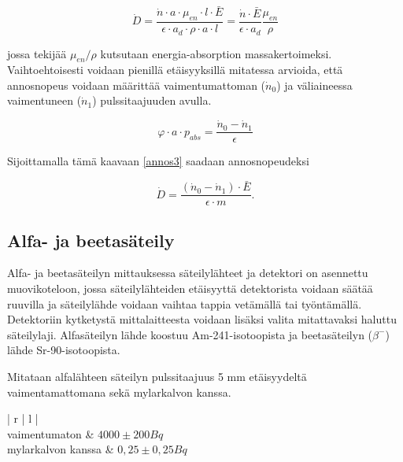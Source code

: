 \documentclass[a4paper,11pt]{article}
\begin{document}
\begin{equation}
  \dot{D} = \frac{\dot{n} \cdot a \cdot \mu_{en} \cdot l \cdot \bar{E}}{\epsilon \cdot a_d \cdot \rho \cdot a \cdot l} = \frac{\dot{n} \cdot \bar{E}}{\epsilon \cdot a_d} \frac{ \mu_{en}}{\rho}
\end{equation}

jossa tekijää $\mu_{en}/\rho$ kutsutaan energia-absorption massakertoimeksi. Vaihtoehtoisesti voidaan pienillä etäisyyksillä mitatessa arvioida, että annosnopeus voidaan määrittää vaimentumattoman ($\dot{n}_0$) ja väliaineessa vaimentuneen ($\dot{n}_1$) pulssitaajuuden avulla. 

\begin{equation}
  \varphi \cdot a \cdot p_{abs} = \frac{\dot{n}_0-\dot{n}_1}{\epsilon}
\end{equation}

Sijoittamalla tämä kaavaan \ref{annos3} saadaan annosnopeudeksi

\begin{equation}
  \dot{D} = \frac{(\dot{n}_0-\dot{n}_1) \cdot \bar{E}}{\epsilon \cdot m} .
\end{equation}

\subsection{Alfa- ja beetasäteily}
\label{alfabeeta}

Alfa- ja beetasäteilyn mittauksessa säteilylähteet ja detektori on asennettu muovikoteloon, jossa säteilylähteiden etäisyyttä detektorista voidaan säätää ruuvilla ja säteilylähde voidaan vaihtaa tappia vetämällä tai työntämällä. Detektoriin kytketystä mittalaitteesta voidaan lisäksi valita mitattavaksi haluttu säteilylaji. Alfasäteilyn lähde koostuu Am-241-isotoopista ja beetasäteilyn ($\beta^-$) lähde Sr-90-isotoopista. 

Mitataan alfalähteen säteilyn pulssitaajuus 5 mm etäisyydeltä vaimentamattomana sekä mylarkalvon kanssa. 
\begin{table}[h]
\begin{center}
\caption{Alfasäteilyn aiheuttama pulssitaajuus}
\begin{tabular}{ | r | l | }
  \hline 
   \\ \hline
  vaimentumaton & $4000 \pm 200 Bq$ \\ \hline
  mylarkalvon kanssa & $0,25 \pm 0,25 Bq$ \\ \hline
\end{tabular}
\end{center}
\end{table}
\end{document}
